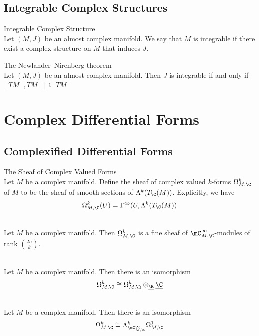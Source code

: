 \documentclass[a4paper]{article}
\begin{document}
\subsection{Integrable Complex Structures}
\begin{defn}{Integrable Complex Structure}{}\\
Let $(M,J)$ be an almost complex manifold. We say that $M$ is integrable if there exist a complex structure on $M$ that induces $J$. 
\end{defn}

\begin{thm}{The Newlander–Nirenberg theorem}{}\\
Let $(M,J)$ be an almost complex manifold. Then $J$ is integrable if and only if $[TM^-,TM^-]\subseteq TM^-$
\end{thm}

\pagebreak
\section{Complex Differential Forms}
\subsection{Complexified Differential Forms}
\begin{defn}{The Sheaf of Complex Valued Forms}{}\\
Let $M$ be a complex manifold. Define the sheaf of complex valued $k$-forms $\Omega_{M,\C}^k$ of $M$ to be the sheaf of smooth sections of $\Lambda^k(T_\C(M))$. Explicitly, we have $$\Omega_{M,\C}^k(U)=\Gamma^\infty(U,\Lambda^k(T_\C(M))$$
\end{defn}

\begin{lmm}{}{}\\
Let $M$ be a complex manifold. Then $\Omega_{M,\C}^k$ is a fine sheaf of $\mC_{M,\C}^\infty$-modules of rank $\binom{2n}{k}$. 
\end{lmm}

\begin{lmm}{}{}\\
Let $M$ be a complex manifold. Then there is an isomorphism $$\Omega_{M,\C}^k\cong\Omega_{M,\R}^k\otimes_{\underline{\R}}\underline{\C}$$
\end{lmm}

\begin{lmm}{}{}\\
Let $M$ be a complex manifold. Then there is an isomorphism $$\Omega_{M,\C}^k\cong\Lambda_{\mC_{M,\C}^\infty}^k\Omega_{M,\C}^1$$
\end{lmm}
\end{document}
